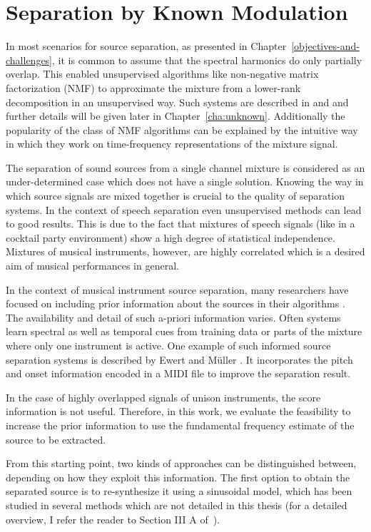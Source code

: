 \chapter{Separation by Known Modulation}
\label{cha:known}

In most scenarios for source separation, as presented in Chapter~\ref{objectives-and-challenges}, it is common to assume that the spectral harmonics do only partially overlap.
This enabled unsupervised algorithms like non-negative matrix factorization (NMF) to approximate the mixture from a lower-rank decomposition in an unsupervised way.
Such systems are described in \cite{smaragdis03} and \cite{virtanen07} and further details will be given later in Chapter~\ref{cha:unknown}.
Additionally the popularity of the class of NMF algorithms can be explained by the intuitive way in which they work on time-frequency representations of the mixture signal.
\par
The separation of sound sources from a single channel mixture is considered as an under-determined case which does not have a single solution. Knowing the way in which source signals are mixed together is crucial to the quality of separation systems. In the context of speech separation even unsupervised methods can lead to good results. This is due to the fact that mixtures of speech signals (like in a cocktail party environment) show a high degree of statistical independence. Mixtures of musical instruments, however, are highly correlated which is a desired aim of musical performances in general.

In the context of musical instrument source separation, many researchers have focused on including prior information about the sources in their algorithms \cite{ozerov12}.
The availability and detail of such a-priori information varies. Often systems learn spectral as well as temporal cues from training data or parts of the mixture where only one instrument is active.
One example of such informed source separation systems is described by Ewert and M\"uller \cite{ewert12}.
It incorporates the pitch and onset information encoded in a MIDI file to improve the separation result.

In the case of highly overlapped signals of unison instruments, the score information is not useful.
Therefore, in this work, we evaluate the feasibility to increase the prior information to use the fundamental frequency estimate of the source to be extracted.

From this starting point, two kinds of approaches can be distinguished between, depending on how they exploit this information.
The first option to obtain the separated source is to re-synthesize it using a sinusoidal model, which has been studied in several methods which are not detailed in this thesis (for a detailed overview, I refer the reader to Section III A of~\cite{rafii}).

